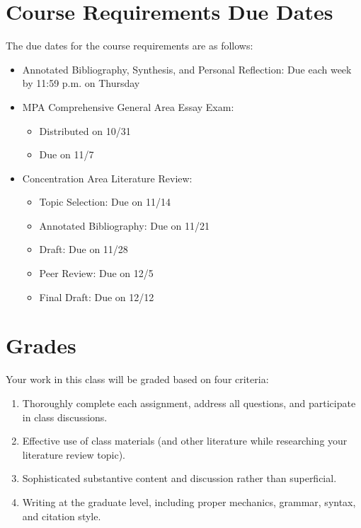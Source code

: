 \documentclass[12pt, letterpaper]{article}
\begin{document}
\section{Course Requirements Due Dates}

The due dates for the course requirements are as follows:
    \begin{itemize}
        \item Annotated Bibliography, Synthesis, and Personal Reflection: Due each week by 11:59 p.m. on Thursday
        \item MPA Comprehensive General Area Essay Exam:
        \begin{itemize}
            \item Distributed on 10/31
            \item Due on 11/7
        \end{itemize}
        \item Concentration Area Literature Review:
        \begin{itemize}
            \item Topic Selection: Due on 11/14
            \item Annotated Bibliography: Due on 11/21
            \item Draft: Due on 11/28
            \item Peer Review: Due on 12/5
            \item Final Draft: Due on 12/12
        \end{itemize}
    \end{itemize}

\section{Grades}

Your work in this class will be graded based on four criteria:
    \begin{enumerate}
        \item Thoroughly complete each assignment, address all questions, and participate in class discussions.
        \item Effective use of class materials (and other literature while researching your literature review topic).
        \item Sophisticated substantive content and discussion rather than superficial.
        \item Writing at the graduate level, including proper mechanics, grammar, syntax, and citation style.
    \end{enumerate}
\end{document}
